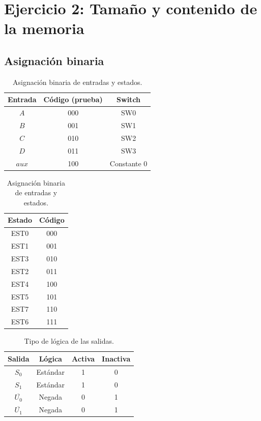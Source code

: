 \documentclass[11pt,letterpaper]{article}
\newcommand{\nb}[1]{\overline{#1}}
\begin{document}
\section{Ejercicio 2: Tamaño y contenido de la memoria}

\subsection{Asignación binaria}

\begin{table}[H]
\centering
\begin{tabular}{ccc}
\toprule
\textbf{Entrada} & \textbf{Código (prueba)} & \textbf{Switch} \\
\midrule
$A$   & 000 & SW0 \\
$B$   & 001 & SW1 \\
$C$   & 010 & SW2 \\
$D$   & 011 & SW3 \\
$aux$ & 100 & Constante 0 \\
\bottomrule
\end{tabular}
\hspace{1.5cm}
\begin{tabular}{cc}
\toprule
\textbf{Estado} & \textbf{Código} \\
\midrule
EST0 & 000 \\
EST1 & 001 \\
EST3 & 010 \\
EST2 & 011 \\
EST4 & 100 \\
EST5 & 101 \\
EST7 & 110 \\
EST6 & 111 \\
\bottomrule
\end{tabular}
\caption{Asignación binaria de entradas y estados.}
\end{table}

\begin{table}[H]
\centering
\begin{tabular}{cccc}
\toprule
\textbf{Salida} & \textbf{Lógica} & \textbf{Activa} & \textbf{Inactiva} \\
\midrule
$S_0$ & Estándar & 1 & 0 \\
$S_1$ & Estándar & 1 & 0 \\
$\nb{U_0}$ & Negada & 0 & 1 \\
$\nb{U_1}$ & Negada & 0 & 1 \\
\bottomrule
\end{tabular}
\caption{Tipo de lógica de las salidas.}
\end{table}
\end{document}
